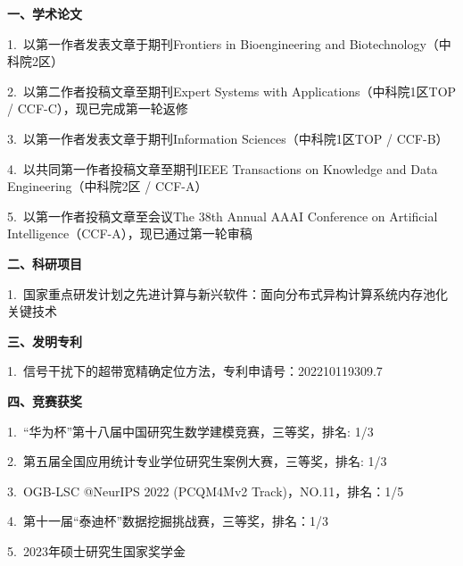 \cleardoublepage
{}

\noindent {}
\vskip 10pt

\vskip 5pt
\noindent \textbf{一、学术论文}
\vskip 5pt 

1.~以第一作者发表文章于期刊Frontiers in Bioengineering and Biotechnology（中科院2区）

2.~以第二作者投稿文章至期刊Expert Systems with Applications（中科院1区TOP / CCF-C），现已完成第一轮返修

3.~以第一作者发表文章于期刊Information Sciences（中科院1区TOP / CCF-B）

4.~以共同第一作者投稿文章至期刊IEEE Transactions on Knowledge and Data Engineering（中科院2区 / CCF-A）

5.~以第一作者投稿文章至会议The 38th Annual AAAI Conference on Artificial Intelligence（CCF-A），现已通过第一轮审稿

\vskip 5pt 
\noindent \textbf{二、科研项目}
\vskip 5pt 

1.~国家重点研发计划之先进计算与新兴软件：面向分布式异构计算系统内存池化关键技术

\vskip 5pt 
\noindent \textbf{三、发明专利}
\vskip 5pt 

1.~信号干扰下的超带宽精确定位方法，专利申请号：202210119309.7

\vskip 5pt 
\noindent \textbf{四、竞赛获奖}
\vskip 5pt 

1.~“华为杯”第十八届中国研究生数学建模竞赛，三等奖，排名: 1/3

2.~第五届全国应用统计专业学位研究生案例大赛，三等奖，排名: 1/3

3.~OGB-LSC @NeurIPS 2022 (PCQM4Mv2 Track)，NO.11，排名：1/5

4.~第十一届“泰迪杯”数据挖掘挑战赛，三等奖，排名：1/3

5.~2023年硕士研究生国家奖学金
\newpage